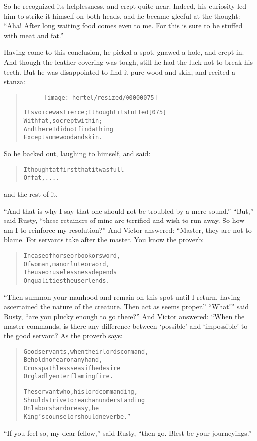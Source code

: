 \documentclass[article, twoside, 10pt]{memoir}
\renewenvironment{verbatim}{%
\begin{quote}%
\vskip -10pt%
\begin{alltt}\normalfont\small}{\end{alltt}%
\end{quote}%
\vskip -10pt
} %
\begin{document}
So he recognized its helplessness, and crept quite near. Indeed,
his curiosity led him to strike it himself on both heads, and he
became gleeful at the thought:
``Aha! After long waiting food comes even to me. For this is sure to be stuffed with meat and fat.''

Having come to this conclusion, he picked a spot, gnawed a hole,
and crept in. And though the leather covering was tough, still he
had the luck not to break his teeth. But he was disappointed to
find it pure wood and skin, and recited a stanza:

\begin{verbatim}
\begin{figure}[p]\texttt{[image: hertel/resized/00000075]}\end{figure}Its voice was fierce; I thought it stuffed              [075]
    With fat, so crept within;
And there I did not find a thing
    Except some wood and skin.
\end{verbatim}
So he backed out, laughing to himself, and said:

\begin{verbatim}
I thought at first that it was full
Of fat, ....
\end{verbatim}
and the rest of it.

``And that is why I say that one should not be troubled by a mere sound.''
``But,'' said Rusty,
``these retainers of mine are terrified and wish to run away. So how am I to reinforce my resolution?''
And Victor answered: “Master, they are not to blame. For servants
take after the master. You know the proverb:

\begin{verbatim}
In case of horse or book or sword,
Of woman, man or lute or word,
The use or uselessness depends
On qualities the user lends.
\end{verbatim}
``Then summon your manhood and remain on this spot until I return, having ascertained the nature of the creature. Then act as seems proper.''
``What!'' said Rusty, ``are you plucky enough to go there?'' And
Victor answered: “When the master commands, is there any difference
between `possible' and `impossible' to the good servant? As the
proverb says:

\begin{verbatim}
Good servants, when their lords command,
Behold no fear on any hand,
Cross pathless seas if he desire
Or gladly enter flaming fire.

The servant who, his lord commanding,
Should strive to reach an understanding
On labors hard or easy, he
King's counselor should never be.”
\end{verbatim}
``If you feel so, my dear fellow,'' said Rusty,
``then go. Blest be your journeyings.''
\end{document}
